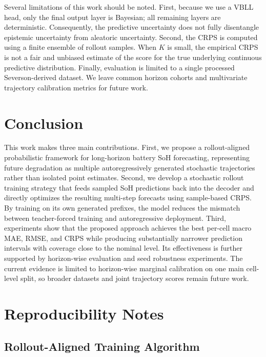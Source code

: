 \documentclass[conference]{IEEEtran}
\begin{document}
Several limitations of this work should be noted. First, because we use a VBLL
head, only the final output layer is Bayesian; all remaining layers are
deterministic. Consequently, the
predictive uncertainty does not fully disentangle epistemic uncertainty from
aleatoric uncertainty. Second, the CRPS is computed using a finite ensemble of
rollout samples. When $K$ is small, the empirical CRPS is not a fair and
unbiased estimate of the score for the true underlying continuous predictive
distribution. Finally, evaluation is limited to a single processed
Severson-derived dataset. We leave common horizon cohorts and multivariate
trajectory calibration metrics for future work.

\section{Conclusion}

This work makes three main contributions. First, we propose a rollout-aligned
probabilistic framework for long-horizon battery SoH forecasting, representing
future degradation as multiple autoregressively generated stochastic
trajectories rather than isolated point estimates. Second, we develop a
stochastic rollout training strategy that feeds sampled SoH predictions back
into the decoder and directly optimizes the resulting multi-step forecasts
using sample-based CRPS. By training on its own generated prefixes, the model
reduces the mismatch between teacher-forced training and autoregressive
deployment. Third, experiments show that the proposed approach achieves the
best per-cell macro MAE, RMSE, and CRPS while producing substantially narrower
prediction intervals with coverage close to the nominal level. Its
effectiveness is further supported by horizon-wise evaluation and seed
robustness experiments. The current evidence is limited to horizon-wise
marginal calibration on one main cell-level split, so broader datasets and
joint trajectory scores remain future work.

\appendices

\section{Reproducibility Notes}

\subsection{Rollout-Aligned Training Algorithm}
\end{document}
